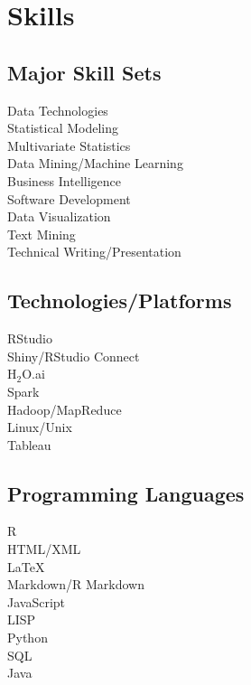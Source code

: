 \documentclass[letterpaper]{deedy-resume} %
\begin{document}
\begin{minipage}[t]{0.35\textwidth}

\section{Skills}
\subsection{Major Skill Sets}
Data Technologies\\
Statistical Modeling\\
Multivariate Statistics\\
Data Mining/Machine Learning\\
Business Intelligence\\
Software Development\\
Data Visualization\\
Text Mining\\
Technical Writing/Presentation

\sectionspace %
\vspace{4pt}
\subsection{Technologies/Platforms}
RStudio\\
Shiny/RStudio Connect\\
H$_2$O.ai\\
Spark\\
Hadoop/MapReduce\\
Linux/Unix\\
Tableau

\sectionspace %
\vspace{3pt}
\subsection{Programming Languages}
R\\
HTML/XML\\
\LaTeX\\
Markdown/R Markdown\\
\vspace{3pt}
JavaScript\\
LISP\\
Python\\
SQL\\
Java



\end{minipage} %
\end{document}
